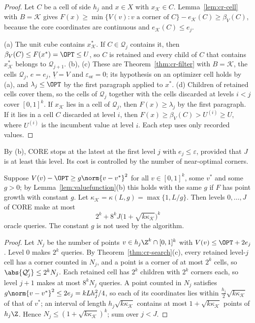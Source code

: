 \begin{proof}
Let $C$ be a cell of side $h_j$ and $x\in X$ with $x_{\mathcal K}\in C$.
Lemma~\ref{lem:cr-cell} with $B=\mathcal K$ gives
$F(x)\ge\min\{V(v):v\text{ a corner of }C\}-e_{\mathcal K}(C)\ge\beta_V(C)$,
because the core coordinates are continuous and $e_{\mathcal K}(C)\le e_j$.

(a) The unit cube contains $x^*_{\mathcal K}$. If $C\in\mathcal Q_j$ contains
it, then $\beta_V(C)\le F(x^*)=\OPT\le U$, so $C$ is retained and every
child of $C$ that contains $x^*_{\mathcal K}$ belongs to $\mathcal Q_{j+1}$.
(b), (c) These are Theorem~\ref{thm:cr-filter} with $B=\mathcal K$, the
cells $\mathcal Q_j$, $e=e_j$, $\underline V=V$ and $\varepsilon_{\mathrm{or}}=0$; its hypothesis
on an optimizer cell holds by (a), and $\lambda_j\le\OPT$ by the first
paragraph applied to $x^*$.
(d) Children of retained cells cover them, so the cells of $\mathcal Q_j$
together with the cells discarded at levels $i<j$ cover $[0,1]^k$. If
$x_{\mathcal K}$ lies in a cell of $\mathcal Q_j$, then $F(x)\ge\lambda_j$ by
the first paragraph. If it lies in a cell $C$ discarded at level $i$, then
$F(x)\ge\beta_V(C)>U^{(i)}\ge U$, where $U^{(i)}$ is the incumbent value at
level $i$. Each step uses only recorded values.
\end{proof}

By (b), CORE stops at the latest at the first level $j$ with
$e_j\le\varepsilon$, provided that $J$ is at least this level. Its cost is
controlled by the number of near-optimal corners.

\begin{proposition}\label{prop:cr-growth}
Suppose $V(v)-\OPT\ge g\norm{v-v^*}^2$ for all $v\in[0,1]^k$, some $v^*$
and some $g>0$; by Lemma~\ref{lem:valuefunction}(b) this holds with the same
$g$ if $F$ has point growth with constant $g$. Let
$\kappa_{\mathcal K}=\kappa(L,g)=\max\{1,L/g\}$. Then levels $0,\dots,J$ of
CORE make at most
\[
2^k+8^kJ\bigl(1+\sqrt{k\kappa_{\mathcal K}}\bigr)^k
\]
oracle queries. The constant $g$ is not used by the algorithm.
\end{proposition}

\begin{proof}
Let $N_j$ be the number of points $v\in h_j\Z^k\cap[0,1]^k$ with
$V(v)\le\OPT+2e_j$. Level $0$ makes $2^k$ queries. By
Theorem~\ref{thm:cr-search}(c), every retained level-$j$ cell has a corner
counted in $N_j$, and a point is a corner of at most $2^k$ cells, so
$\abs{\mathcal Q_j'}\le2^kN_j$. Each retained cell has $2^k$ children with
$2^k$ corners each, so level $j+1$ makes at most $8^kN_j$ queries. A point
counted in $N_j$ satisfies $g\norm{v-v^*}^2\le2e_j=kLh_j^2/4$, so each of
its coordinates lies within $\frac{h_j}2\sqrt{k\kappa_{\mathcal K}}$ of that
of $v^*$; an interval of length $h_j\sqrt{k\kappa_{\mathcal K}}$ contains at
most $1+\sqrt{k\kappa_{\mathcal K}}$ points of $h_j\Z$. Hence
$N_j\le(1+\sqrt{k\kappa_{\mathcal K}})^k$; sum over $j<J$.
\end{proof}

